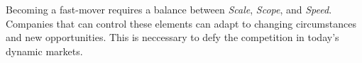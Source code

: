 \documentclass[a4]{scrartcl}
\begin{document}
Becoming a fast-mover requires a balance between \textit{Scale}, \textit{Scope}, and \textit{Speed}. Companies that can control these elements can adapt to changing circumstances and new opportunities. This is neccessary to defy the competition in today's dynamic markets.


	
	
	
	
	
	
	

	
	
	
	
\end{document}
